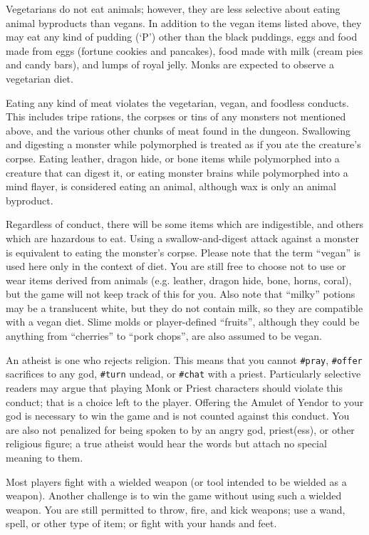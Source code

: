 Vegetarians do not eat animals;
however, they are less selective about eating animal byproducts than vegans.
In addition to the vegan items listed above, they may eat any kind
of pudding (`P') other than the black puddings,
eggs and food made from eggs (fortune cookies and pancakes),
food made with milk (cream pies and candy bars), and lumps of
royal jelly.  Monks are expected to observe a vegetarian diet.

Eating any kind of meat violates the vegetarian, vegan, and foodless
conducts.  This includes tripe rations, the corpses or tins of any
monsters not mentioned above, and the various other chunks of meat
found in the dungeon.  Swallowing and digesting a monster while polymorphed
is treated as if you ate the creature's corpse.
Eating leather, dragon hide, or bone items while
polymorphed into a creature that can digest it, or eating monster brains
while polymorphed into a mind flayer, is considered eating
an animal, although wax is only an animal byproduct.

Regardless of conduct, there will be some items which are indigestible,
and others which are hazardous to eat.  Using a swallow-and-digest
attack against a monster is equivalent to eating the monster's corpse.
Please note that the term ``vegan'' is used here only in the context of
diet.  You are still free to choose not to use or wear items derived
from animals (e.g. leather, dragon hide, bone, horns, coral), but the
game will not keep track of this for you.  Also note that ``milky''
potions may be a translucent white, but they do not contain milk,
so they are compatible with a vegan diet.  Slime molds or
player-defined ``fruits'', although they could be anything
from ``cherries'' to ``pork chops'', are also assumed to be vegan.

An atheist is one who rejects religion.  This means that you cannot
{\tt \#pray}, {\tt \#offer} sacrifices to any god, {\tt \#turn} undead,
or {\tt \#chat} with a priest.
Particularly selective readers may argue that playing Monk or Priest
characters should violate this conduct; that is a choice left to the
player.  Offering the Amulet of Yendor to your god is necessary to
win the game and is not counted against this conduct.  You are also
not penalized for being spoken to by an angry god, priest(ess), or
other religious figure; a true atheist would hear the words but
attach no special meaning to them.

Most players fight with a wielded weapon (or tool intended to be
wielded as a weapon).  Another challenge is to win the game without
using such a wielded weapon.  You are still permitted to throw,
fire, and kick weapons; use a wand, spell, or other type of item;
or fight with your hands and feet.


